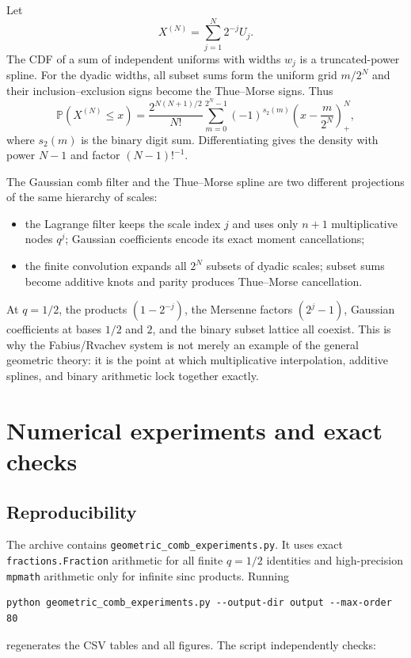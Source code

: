 \documentclass[11pt,a4paper,oneside]{article}
\theoremstyle{definition}
\theoremstyle{remark}
\newcommand{\Prob}{\mathbb P}
\begin{document}
Let
\begin{equation}
 X^{(N)}=\sum_{j=1}^N2^{-j}U_j.
 \label{eq:finite-dyadic-sum}
\end{equation}
The CDF of a sum of independent uniforms with widths $w_j$ is a truncated-power
spline.  For the dyadic widths, all subset sums form the uniform grid
$m/2^N$ and their inclusion--exclusion signs become the Thue--Morse signs.
Thus
\begin{equation}
 \Prob(X^{(N)}\le x)
 =\frac{2^{N(N+1)/2}}{N!}
 \sum_{m=0}^{2^N-1}(-1)^{s_2(m)}
 \left(x-\frac{m}{2^N}\right)_+^N,
 \label{eq:thue-morse-spline-cdf}
\end{equation}
where $s_2(m)$ is the binary digit sum.  Differentiating gives the density with
power $N-1$ and factor $(N-1)!^{-1}$.

The Gaussian comb filter and the Thue--Morse spline are two different
projections of the same hierarchy of scales:

\begin{itemize}
\item the Lagrange filter keeps the scale index $j$ and uses only $n+1$
      multiplicative nodes $q^j$; Gaussian coefficients encode its exact
      moment cancellations;
\item the finite convolution expands all $2^N$ subsets of dyadic scales;
      subset sums become additive knots and parity produces Thue--Morse
      cancellation.
\end{itemize}

At $q=1/2$, the products $(1-2^{-j})$, the Mersenne factors $(2^j-1)$,
Gaussian coefficients at bases $1/2$ and $2$, and the binary subset lattice
all coexist.  This is why the Fabius/Rvachev system is not merely an example of
the general geometric theory: it is the point at which multiplicative
interpolation, additive splines, and binary arithmetic lock together exactly.

\section{Numerical experiments and exact checks}
\label{sec:numerics}

\subsection{Reproducibility}

The archive contains \texttt{geometric\_comb\_experiments.py}.  It uses exact
\texttt{fractions.Fraction} arithmetic for all finite $q=1/2$ identities and
high-precision \texttt{mpmath} arithmetic only for infinite sinc products.
Running
\begin{lstlisting}[style=pythonstyle]
python geometric_comb_experiments.py --output-dir output --max-order 80
\end{lstlisting}
regenerates the CSV tables and all figures.  The script independently checks:
\end{document}
